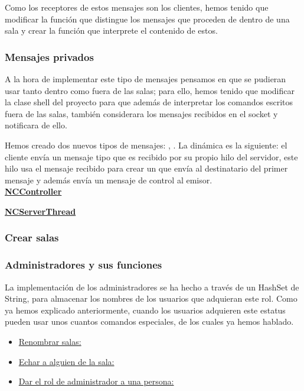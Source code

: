 Como los receptores de estos mensajes son los clientes, hemos tenido que modificar la función que distingue los mensajes que proceden de dentro de una sala y crear la función que interprete el contenido de estos.

\subsubsection{Mensajes privados}
A la hora de implementar este tipo de mensajes pensamos en que se pudieran usar tanto dentro como fuera de las salas; para ello, hemos tenido que modificar la clase shell del proyecto para que además de interpretar los comandos escritos fuera de las salas, también considerara los mensajes recibidos en el socket y notificara de ello.

Hemos creado dos nuevos tipos de mensajes: , . La dinámica es la siguiente: el cliente envía un mensaje tipo  que es recibido por su propio hilo del servidor, este hilo usa el mensaje recibido para crear un  que envía al destinatario del primer mensaje y además envía un mensaje de control al emisor.\\

\textbf{\underline{NCController}}


\textbf{\underline{NCServerThread}} %


\subsubsection{Crear salas}


\subsubsection{Administradores y sus funciones}
La implementación de los administradores se ha hecho a través de un HashSet de String, para almacenar los nombres de los usuarios que adquieran este rol. Como ya hemos explicado anteriormente, cuando los usuarios adquieren este estatus pueden usar unos cuantos comandos especiales, de los cuales ya hemos hablado. 
\begin{itemize} %
    \item \underline{Renombrar salas:} 
    \item \underline{Echar a alguien de la sala:}
    \item \underline{Dar el rol de administrador a una persona:}
\end{itemize}

